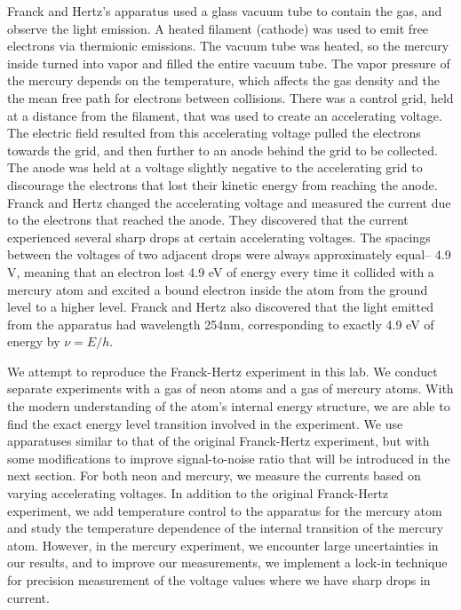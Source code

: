 \documentclass[prb,preprint]{revtex4-1}
\begin{document}
Franck and Hertz's apparatus used a glass vacuum tube to contain the gas, and observe the light emission. A heated filament (cathode) was used to emit free electrons via thermionic emissions. The vacuum tube was heated, so the mercury inside turned into vapor and filled the entire vacuum tube. The vapor pressure of the mercury depends on the temperature, which affects the gas density and the the mean free path for electrons between collisions. There was a control grid, held at a distance from the filament, that was used to create an accelerating voltage. The electric field resulted from this accelerating voltage pulled the electrons towards the grid, and then further to an anode behind the grid to be collected. The anode was held at a voltage slightly negative to the accelerating grid to discourage the electrons that lost their kinetic energy from reaching the anode. Franck and Hertz changed the accelerating voltage and measured the current due to the electrons that reached the anode. They discovered that the current experienced several sharp drops at certain accelerating voltages. The spacings between the voltages of two adjacent drops were always approximately equal-- 4.9 V, meaning that an electron lost 4.9 eV of energy every time it collided with a mercury atom and excited a bound electron inside the atom from the ground level to a higher level. Franck and Hertz also discovered that the light emitted from the apparatus had wavelength 254nm, corresponding to exactly 4.9 eV of energy by $\nu=E/h$.

We attempt to reproduce the Franck-Hertz experiment in this lab. We conduct separate experiments with a gas of neon atoms and a gas of mercury atoms. With the modern understanding of the atom's internal energy structure, we are able to find the exact energy level transition involved in the experiment. We use apparatuses similar to that of the original Franck-Hertz experiment, but with some modifications to improve signal-to-noise ratio that will be introduced in the next section. For both neon and mercury, we measure the currents based on varying accelerating voltages. In addition to the original Franck-Hertz experiment, we add temperature control to the apparatus for the mercury atom and study the temperature dependence of the internal transition of the mercury atom. However, in the mercury experiment, we encounter large uncertainties in our results, and to improve our measurements, we implement a lock-in technique for precision measurement of the voltage values where we have sharp drops in current.
\end{document}
